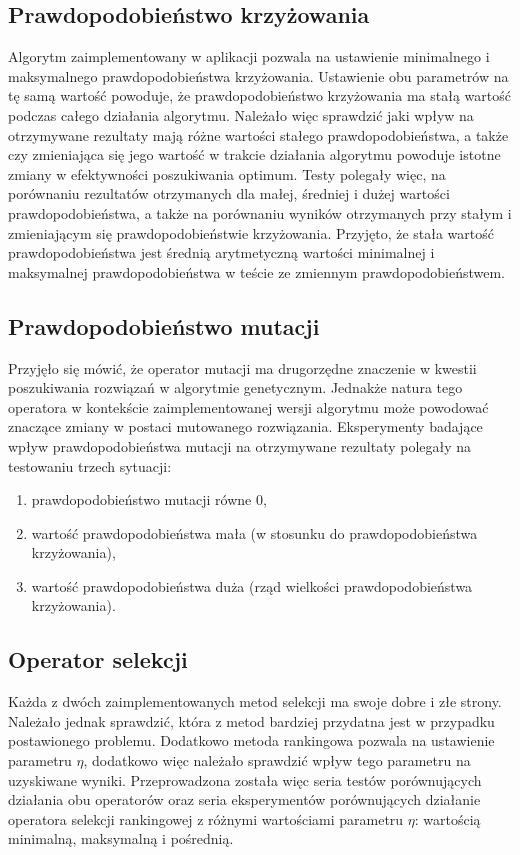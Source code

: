 \subsection{Prawdopodobieństwo krzyżowania}
Algorytm zaimplementowany w aplikacji pozwala na ustawienie minimalnego i maksymalnego prawdopodobieństwa krzyżowania. Ustawienie obu parametrów na tę samą wartość powoduje, że prawdopodobieństwo krzyżowania ma stałą wartość podczas całego działania algorytmu. Należało więc sprawdzić jaki wpływ na otrzymywane rezultaty mają różne wartości stałego prawdopodobieństwa, a także czy zmieniająca się jego wartość w trakcie działania algorytmu powoduje istotne zmiany w efektywności poszukiwania optimum. Testy polegały więc, na porównaniu rezultatów otrzymanych dla małej, średniej i dużej wartości prawdopodobieństwa, a także na porównaniu wyników otrzymanych przy stałym i zmieniającym się prawdopodobieństwie krzyżowania. Przyjęto, że stała wartość prawdopodobieństwa jest średnią arytmetyczną wartości minimalnej i maksymalnej prawdopodobieństwa w teście ze zmiennym prawdopodobieństwem.

\subsection{Prawdopodobieństwo mutacji}
Przyjęło się mówić, że operator mutacji ma drugorzędne znaczenie w kwestii poszukiwania rozwiązań w algorytmie genetycznym. Jednakże natura tego operatora w kontekście zaimplementowanej wersji algorytmu może powodować znaczące zmiany w postaci mutowanego rozwiązania. Eksperymenty badające wpływ prawdopodobieństwa mutacji na otrzymywane rezultaty polegały na testowaniu trzech sytuacji:
\begin{enumerate}
\item prawdopodobieństwo mutacji równe 0,
\item wartość prawdopodobieństwa mała (w stosunku do prawdopodobieństwa krzyżowania),
\item wartość prawdopodobieństwa duża (rząd wielkości prawdopodobieństwa krzyżowania).
\end{enumerate}

\subsection{Operator selekcji}
Każda z dwóch zaimplementowanych metod selekcji ma swoje dobre i złe strony. Należało jednak sprawdzić, która z metod bardziej przydatna jest w przypadku postawionego problemu. Dodatkowo metoda rankingowa pozwala na ustawienie parametru $\eta$, dodatkowo więc należało sprawdzić wpływ tego parametru na uzyskiwane wyniki. Przeprowadzona została więc seria testów porównujących działania obu operatorów oraz seria eksperymentów porównujących działanie operatora selekcji rankingowej z różnymi wartościami parametru $\eta$: wartością minimalną, maksymalną i pośrednią. 

